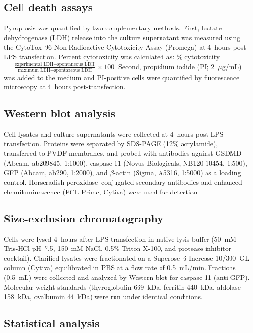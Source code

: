 \documentclass[11pt,a4paper]{article}
\begin{document}
\subsection{Cell death assays}

Pyroptosis was quantified by two complementary methods. First, lactate dehydrogenase (LDH) release into the culture supernatant was measured using the CytoTox~96 Non-Radioactive Cytotoxicity Assay (Promega) at 4~hours post-LPS transfection. Percent cytotoxicity was calculated as: \% cytotoxicity $= \frac{\text{experimental LDH} - \text{spontaneous LDH}}{\text{maximum LDH} - \text{spontaneous LDH}} \times 100$. Second, propidium iodide (PI; 2~$\mu$g/mL) was added to the medium and PI-positive cells were quantified by fluorescence microscopy at 4~hours post-transfection.

\subsection{Western blot analysis}

Cell lysates and culture supernatants were collected at 4~hours post-LPS transfection. Proteins were separated by SDS-PAGE (12\% acrylamide), transferred to PVDF membranes, and probed with antibodies against GSDMD (Abcam, ab209845, 1:1000), caspase-11 (Novus Biologicals, NB120-10454, 1:500), GFP (Abcam, ab290, 1:2000), and $\beta$-actin (Sigma, A5316, 1:5000) as a loading control. Horseradish peroxidase--conjugated secondary antibodies and enhanced chemiluminescence (ECL Prime, Cytiva) were used for detection.

\subsection{Size-exclusion chromatography}

Cells were lysed 4~hours after LPS transfection in native lysis buffer (50~mM Tris-HCl pH~7.5, 150~mM NaCl, 0.5\% Triton X-100, and protease inhibitor cocktail). Clarified lysates were fractionated on a Superose~6 Increase 10/300~GL column (Cytiva) equilibrated in PBS at a flow rate of 0.5~mL/min. Fractions (0.5~mL) were collected and analyzed by Western blot for caspase-11 (anti-GFP). Molecular weight standards (thyroglobulin 669~kDa, ferritin 440~kDa, aldolase 158~kDa, ovalbumin 44~kDa) were run under identical conditions.

\subsection{Statistical analysis}
\end{document}
